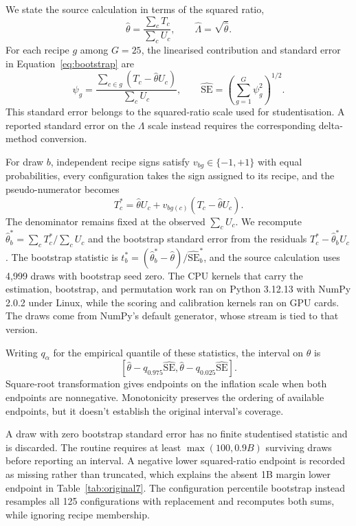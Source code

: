 We state the source calculation in terms of the squared ratio,
\[
\widehat\theta=\frac{\sum_cT_c}{\sum_cU_c},\qquad
\widehat\Lambda=\sqrt{\widehat\theta}. \]
For each recipe $g$ among $G=25$, the linearised contribution and standard error in Equation~\ref{eq:bootstrap} are
\begin{equation}
\psi_g=\frac{\sum_{c\in g}(T_c-\widehat\theta U_c)}{\sum_cU_c},
\qquad
\widehat{\mathrm{SE}}=\left(\sum_{g=1}^{G}\psi_g^2\right)^{1/2}. \label{eq:bootstrap}
\end{equation}
This standard error belongs to the squared-ratio scale used for studentisation. A reported standard error on the $\Lambda$ scale instead requires the corresponding delta-method conversion.

For draw $b$, independent recipe signs satisfy $v_{bg}\in\{-1,+1\}$ with equal probabilities, every configuration takes the sign assigned to its recipe, and the pseudo-numerator becomes \[ T_c^*=\widehat\theta U_c+v_{bg(c)}(T_c-\widehat\theta U_c). \]
The denominator remains fixed at the observed $\sum_cU_c$. We recompute $\widehat\theta_b^*=\sum_cT_c^*/\sum_cU_c$ and the bootstrap standard error from the residuals $T_c^*-\widehat\theta_b^*U_c$. The bootstrap statistic is $t_b^*=(\widehat\theta_b^*-\widehat\theta)/\widehat{\mathrm{SE}}_b^*$, and the source calculation uses 4,999 draws with bootstrap seed zero. The CPU kernels that carry the estimation, bootstrap, and permutation work ran on Python 3.12.13 with NumPy 2.0.2 under Linux, while the scoring and calibration kernels ran on GPU cards. The draws come from NumPy's default generator, whose stream is tied to that version.

Writing $q_\alpha$ for the empirical quantile of these statistics, the interval on $\theta$ is
\[
\left[\widehat\theta-q_{0.975}\widehat{\mathrm{SE}},
\widehat\theta-q_{0.025}\widehat{\mathrm{SE}}\right]. \]
Square-root transformation gives endpoints on the inflation scale when both endpoints are nonnegative. Monotonicity preserves the ordering of available endpoints, but it doesn't establish the original interval's coverage.

A draw with zero bootstrap standard error has no finite studentised statistic and is discarded. The routine requires at least $\max(100,0.9B)$ surviving draws before reporting an interval. A negative lower squared-ratio endpoint is recorded as missing rather than truncated, which explains the absent 1B margin lower endpoint in Table~\ref{tab:original7}. The configuration percentile bootstrap instead resamples all 125 configurations with replacement and recomputes both sums, while ignoring recipe membership.

